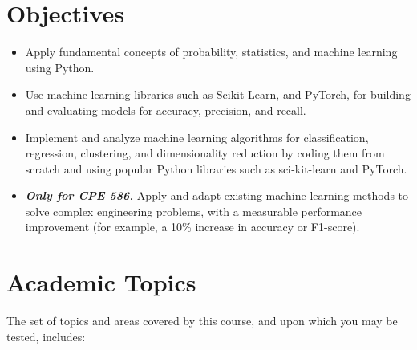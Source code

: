 \documentclass[11pt,oneside,openany]{book}
\begin{document}
\section*{Objectives}
\begin{itemize}
    \item Apply fundamental concepts of probability, statistics, and machine learning using Python.
    \item Use machine learning libraries such as Scikit-Learn, and PyTorch, for building and evaluating models for accuracy, precision, and recall.
    \item Implement and analyze machine learning algorithms for classification, regression, clustering, and dimensionality reduction by coding them from scratch and using popular Python libraries such as sci-kit-learn and PyTorch.
    \item \textit{\textbf{Only for CPE 586.}} Apply and adapt existing machine learning methods to solve complex engineering problems, with a measurable performance improvement (for example, a 10\% increase in accuracy or F1-score).
\end{itemize}

\section*{Academic Topics}
The set of topics and areas covered by this course, and upon which you may be tested, includes:
\end{document}
